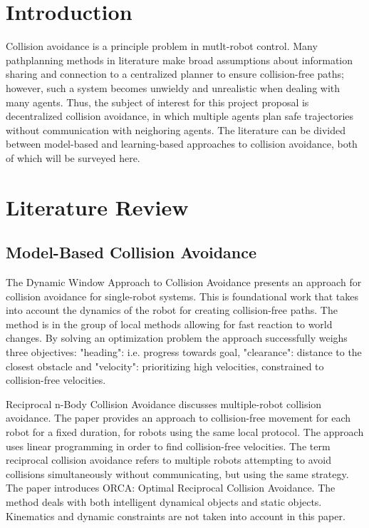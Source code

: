 \documentclass[conference]{IEEEtran}
\begin{document}
\section{Introduction}
Collision avoidance is a principle problem in mutlt-robot control. Many pathplanning methods in literature make broad assumptions about information sharing and connection to a centralized planner to ensure collision-free paths; however, such a system becomes unwieldy and unrealistic when dealing with many agents. Thus, the subject of interest for this project proposal is decentralized collision avoidance, in which multiple agents plan safe trajectories without communication with neighoring agents. The literature can be divided between model-based and learning-based approaches to collision avoidance, both of which will be surveyed here.
\section{Literature Review}

\subsection{Model-Based Collision Avoidance}
The Dynamic Window Approach to Collision Avoidance \cite{fox1997dynamic} presents an approach for collision avoidance for single-robot systems. This is foundational work that takes into account the dynamics of the robot for creating collision-free paths. The method is in the group of local methods allowing for fast reaction to world changes. By solving an optimization problem the approach successfully weighs three objectives: "heading": i.e. progress towards goal, "clearance": distance to the closest obstacle and "velocity": prioritizing high velocities, constrained to collision-free velocities. 

Reciprocal n-Body Collision Avoidance \cite{berg2011reciprocal} discusses multiple-robot collision avoidance. The paper provides an approach to collision-free movement for each robot for a fixed duration, for robots using the same local protocol. The approach uses linear programming in order to find collision-free velocities. The term reciprocal collision avoidance refers to multiple robots attempting to avoid collisions simultaneously without communicating, but using the same strategy. 
The paper introduces ORCA: Optimal Reciprocal Collision Avoidance. The method deals with both intelligent dynamical objects and static objects. Kinematics and dynamic constraints are not taken into account in this paper.
\end{document}
